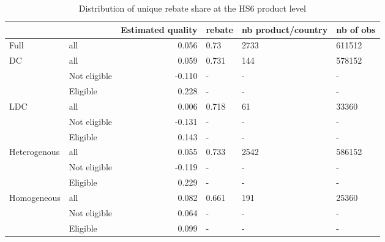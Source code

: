 \documentclass[preview]{standalone}
\begin{document}
\begin{table}[!htbp] \centering
\caption{Distribution of unique rebate share at the HS6 product level}

\begin{adjustbox}{width=\textwidth, totalheight=\baselineskip,keepaspectratio}
\begin{tabular}{llrlll}
\toprule
            &          &  Estimated quality & rebate & nb product/country & nb of obs \\
\midrule
Full & all &              0.056 &   0.73 &               2733 &    611512 \\
DC & all &              0.059 &  0.731 &                144 &    578152 \\
            & Not eligible &             -0.110 &      - &                  - &         - \\
            & Eligible &              0.228 &      - &                  - &         - \\
LDC & all &              0.006 &  0.718 &                 61 &     33360 \\
            & Not eligible &             -0.131 &      - &                  - &         - \\
            & Eligible &              0.143 &      - &                  - &         - \\
Heterogenous & all &              0.055 &  0.733 &               2542 &    586152 \\
            & Not eligible &             -0.119 &      - &                  - &         - \\
            & Eligible &              0.229 &      - &                  - &         - \\
Homogeneous & all &              0.082 &  0.661 &                191 &     25360 \\
            & Not eligible &              0.064 &      - &                  - &         - \\
            & Eligible &              0.099 &      - &                  - &         - \\
\bottomrule
\end{tabular}

\end{adjustbox}

\begin{tablenotes}
\small
\item


\end{tablenotes}
\end{table}
\end{document}
